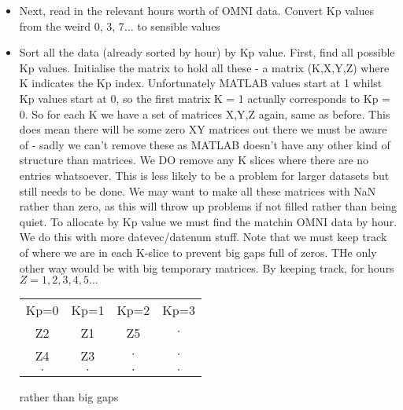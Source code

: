\documentclass[11pt]{article}
\begin{document}
\begin{itemize}
    \item Next, read in the relevant hours worth of OMNI data. Convert Kp values from the weird
        0, 3, 7$\ldots$ to sensible values
    \item Sort all the data (already sorted by hour) by Kp value. First, find all possible Kp
        values. Initialise the matrix to hold all these - a matrix (K,X,Y,Z) where K indicates the
        Kp index. Unfortunately MATLAB values start at 1 whilst Kp values start at 0, so the first
        matrix K = 1 actually corresponds to Kp = 0. So for each K we have a set of matrices X,Y,Z
        again, same as before. This does mean there will be some zero XY matrices out there we must
        be aware of - sadly we can't remove these as MATLAB doesn't have any other kind of
        structure than matrices. We DO remove any K slices where there are no entries
        whatsoever. This is less likely to be a problem for larger datasets but still needs to
        be done. {\color{red} We may want to make all these matrices with NaN rather than zero, as
    this will throw up problems if not filled rather than being quiet.}
        To allocate by Kp value we must find the matchin OMNI data by hour. We do this with more
        datevec/datenum stuff. Note that we must keep track of where we are in each K-slice to
        prevent big gaps full of zeros. THe only other way would be with big temporary matrices. 
        By keeping track, for hours $Z =1,2,3,4,5\ldots$

        \begin{table}[h]
            \begin{tabular}{cccc}
                Kp=0 &Kp=1 &Kp=2 &Kp=3 \\
                Z2 &Z1 &Z5 &$\cdot$ \\
                Z4 &Z3 &$\cdot$ &$\cdot$ \\
                $\cdot$ &$\cdot$ &$\cdot$ &$\cdot$ 
            \end{tabular}
        \end{table}

        rather than big gaps 


\end{itemize}
\end{document}
